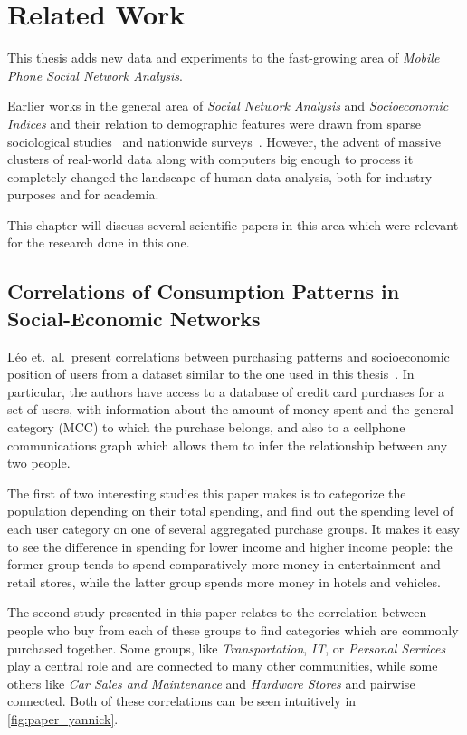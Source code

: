 
\chapter{Related Work}
\label{chap:related_work}


This thesis adds new data and experiments to the fast-growing area of \emph{Mobile Phone Social Network Analysis}.

Earlier works in the general area of \emph{Social Network Analysis} and \emph{Socioeconomic Indices} and their relation to demographic features were drawn from sparse sociological studies~\cite{katz_economics_2001} and nationwide surveys~\cite{deaton1997}. However, the advent of massive clusters of real-world data along with computers big enough to process it completely changed the landscape of human data analysis, both for industry purposes and for academia.

This chapter will discuss several scientific papers in this area which were relevant for the research done in this one.

\section{Correlations of Consumption Patterns in Social-Economic Networks}
\label{sec:leo_correlations}

Léo et.\ al.\ present correlations between purchasing patterns and socioeconomic position of users from a dataset similar to the one used in this thesis~\cite{leo16correlations}. In particular, the authors have access to a database of credit card purchases for a set of users, with information about the amount of money spent and the general category (MCC) to which the purchase belongs, and also to a cellphone communications graph which allows them to infer the relationship between any two people.

The first of two interesting studies this paper makes is to categorize the population depending on their total spending, and find out the spending level of each user category on one of several aggregated purchase groups. It makes it easy to see the difference in spending for lower income and higher income people: the former group tends to spend comparatively more money in entertainment and retail stores, while the latter group spends more money in hotels and vehicles.

The second study presented in this paper relates to the correlation between people who buy from each of these groups to find categories which are commonly purchased together. Some groups, like \emph{Transportation}, \emph{IT}, or \emph{Personal Services} play a central role and are connected to many other communities, while some others like \emph{Car Sales and Maintenance} and \emph{Hardware Stores} and pairwise connected. Both of these correlations can be seen intuitively in \cref{fig:paper_yannick}.

